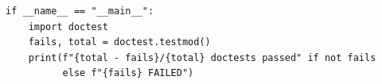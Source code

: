 \documentclass[10pt,letterpaper]{book}
\begin{document}
\begin{lstlisting}[style=file]
if __name__ == "__main__":
    import doctest
    fails, total = doctest.testmod()
    print(f"{total - fails}/{total} doctests passed" if not fails
          else f"{fails} FAILED")

\end{lstlisting}
\backmatter
\end{document}
